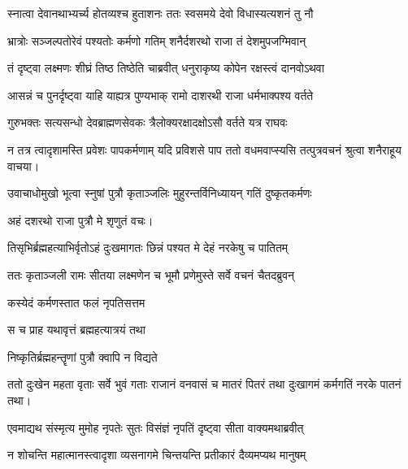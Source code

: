 \twolineshloka
{स्नात्वा देवानथाभ्यर्च्य होतव्यश्च हुताशनः}
{ततः स्वसमये देवो विधास्यत्यशनं तु नौ} %



\twolineshloka
{भ्रात्रोः सञ्जल्पतोरेवं पश्यतोः कर्मणो गतिम्}
{शनैर्दशरथो राजा तं देशमुपजग्मिवान्} %

\twolineshloka
{तं दृष्ट्वा लक्ष्मणः शीघ्रं तिष्ठ तिष्ठेति चाब्रवीत्}
{धनुराकृष्य कोपेन रक्षस्त्वं दानवोऽथवा} %

\twolineshloka
{आसन्नं च पुनर्दृष्ट्वा याहि याह्यत्र पुण्यभाक्}
{रामो दाशरथी राजा धर्मभाक्पश्य वर्तते} %

\twolineshloka
{गुरुभक्तः सत्यसन्धो देवब्राह्मणसेवकः}
{त्रैलोक्यरक्षादक्षोऽसौ वर्तते यत्र राघवः} %

\twolineshloka
{न तत्र त्वादृशामस्ति प्रवेशः पापकर्मणाम्}
{यदि प्रविशसे पाप ततो वधमवाप्स्यसि} %
तत्पुत्रवचनं श्रुत्वा शनैराहूय वाचया।

\twolineshloka
{उवाचाधोमुखो भूत्वा स्नुषां पुत्रौ कृताञ्जलिः}
{मुहुरन्तर्विनिध्यायन् गतिं दुष्कृतकर्मणः} %


अहं दशरथो राजा पुत्रौ मे शृणुतं वचः।

\twolineshloka
{तिसृभिर्ब्रह्महत्याभिर्वृतोऽहं दुःखमागतः}
{छिन्नं पश्यत मे देहं नरकेषु च पातितम्} %



\twolineshloka
{ततः कृताञ्जली रामः सीतया लक्ष्मणेन च}
{भूमौ प्रणेमुस्ते सर्वे वचनं चैतदब्रुवन्} %



\onelineshloka
{कस्येदं कर्मणस्तात फलं नृपतिसत्तम}%



\onelineshloka
{स च प्राह यथावृत्तं ब्रह्महत्यात्रयं तथा}%



\onelineshloka
{निष्कृतिर्ब्रह्महन्तॄणां पुत्रौ क्वापि न विद्यते}%



\twolineshloka
{ततो दुःखेन महता वृताः सर्वे भुवं गताः}
{राजानं वनवासं च मातरं पितरं तथा} %
दुःखागमं कर्मगतिं नरके पातनं तथा।

\twolineshloka
{एवमाद्यथ संस्मृत्य मुमोह नृपतेः सुतः}
{विसंज्ञं नृपतिं दृष्ट्वा सीता वाक्यमथाब्रवीत्} %



\twolineshloka
{न शोचन्ति महात्मानस्त्वादृशा व्यसनागमे}
{चिन्तयन्ति प्रतीकारं दैव्यमप्यथ मानुषम्} %

